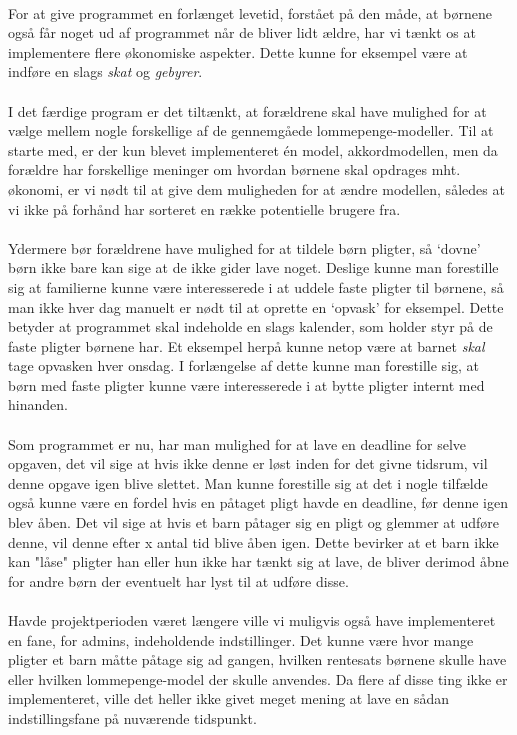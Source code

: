 \\
For at give programmet en forlænget levetid, forstået på den måde, at børnene også får noget ud af programmet når de bliver lidt ældre, har vi tænkt os at implementere flere økonomiske aspekter. Dette kunne for eksempel være at indføre en slags \textit{skat} og \textit{gebyrer}.\\
\\
I det færdige program er det tiltænkt, at forældrene skal have mulighed for at vælge mellem nogle forskellige af de gennemgåede lommepenge-modeller. Til at starte med, er der kun blevet implementeret én model, akkordmodellen, men da forældre har forskellige meninger om hvordan børnene skal opdrages mht. økonomi, er vi nødt til at give dem muligheden for at ændre modellen, således at vi ikke på forhånd har sorteret en række potentielle brugere fra.\\
\\
Ydermere bør forældrene have mulighed for at tildele børn pligter, så ‘dovne’ børn ikke bare kan sige at de ikke gider lave noget. Deslige kunne man forestille sig at familierne kunne være interesserede i at uddele faste pligter til børnene, så man ikke hver dag manuelt er nødt til at oprette en ‘opvask’ for eksempel. Dette betyder at programmet skal indeholde en slags kalender, som holder styr på de faste pligter børnene har. Et eksempel herpå kunne netop være at barnet \textit{skal} tage opvasken hver onsdag. I forlængelse af dette kunne man forestille sig, at børn med faste pligter kunne være interesserede i at bytte pligter internt med hinanden.\\
\\
Som programmet er nu, har man mulighed for at lave en deadline for selve opgaven, det vil sige at hvis ikke denne er løst inden for det givne tidsrum, vil denne opgave igen blive slettet. Man kunne forestille sig at det i nogle tilfælde også kunne være en fordel hvis en påtaget pligt havde en deadline, før denne igen blev åben. Det vil sige at hvis et barn påtager sig en pligt og glemmer at udføre denne, vil denne efter x antal tid blive åben igen. Dette bevirker at et barn ikke kan "låse" pligter han eller hun ikke har tænkt sig at lave, de bliver derimod åbne for andre børn der eventuelt har lyst til at udføre disse.\\
\\
Havde projektperioden været længere ville vi muligvis også have implementeret en fane, for admins, indeholdende indstillinger. Det kunne være hvor mange pligter et barn måtte påtage sig ad gangen, hvilken rentesats børnene skulle have eller hvilken lommepenge-model der skulle anvendes. Da flere af disse ting ikke er implementeret, ville det heller ikke givet meget mening at lave en sådan indstillingsfane på nuværende tidspunkt.